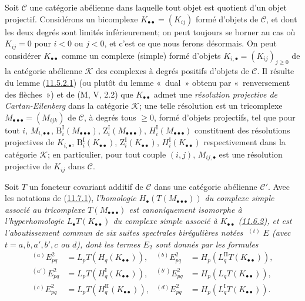 \begin{env}[11.7.1]
\label{0.11.7.1-fr}
Soit $\mathcal C$ une catégorie abélienne dans laquelle tout objet est
quotient d'un objet projectif. Considérons un bicomplexe
$K_{\bullet\bullet}=(K_{ij})$ formé d'objets de $\mathcal C$, et dont les deux
degrés sont limités inférieurement; on peut toujours se borner au cas où
$K_{ij}=0$ pour $i<0$ ou $j<0$, et c'est ce que nous ferons désormais. On
peut considérer $K_{\bullet\bullet}$ comme un complexe (simple) formé
d'objets $K_{i,\bullet}=(K_{ij})_{j\geq 0}$ de la catégorie abélienne
$\mathcal K$ des complexes à degrés positifs d'objets de $\mathcal C$. Il
résulte du lemme (\hyperref[0.11.5.2.1-fr]{11.5.2.1}) (ou plutôt du lemme
«~dual~» obtenu par «~renversement des flèches~») et de (M, V, 2.2) que
$K_{\bullet\bullet}$ admet une \emph{résolution projective de
Cartan-Eilenberg} dans la catégorie $\mathcal K$; une telle résolution est un
tricomplexe $M_{\bullet\bullet\bullet}=(M_{ijk})$ de $\mathcal C$, à degrés
tous $\geq 0$, formé d'objets projectifs, tel que pour tout $i$,
$M_{i,\bullet\bullet}$, $\mathrm B_i^{\mathrm I}(M_{\bullet\bullet\bullet})$,
$\mathrm Z_i^{\mathrm I}(M_{\bullet\bullet\bullet})$,
$H_i^{\mathrm I}(M_{\bullet\bullet\bullet})$ constituent des résolutions
projectives de $K_{i,\bullet}$,
$\mathrm B_i^{\mathrm I}(K_{\bullet\bullet})$,
$\mathrm Z_i^{\mathrm I}(K_{\bullet\bullet})$,
$H_i^{\mathrm I}(K_{\bullet\bullet})$ respectivement dans la catégorie
$\mathcal K$; en particulier, pour tout couple $(i,j)$,
$M_{ij,\bullet}$ est une résolution projective de $K_{ij}$ dans
$\mathcal C$.
\end{env}

\begin{proposition}[11.7.2]
\label{0.11.7.2-fr}
Soit $T$ un foncteur covariant additif de $\mathcal C$ dans une catégorie
abélienne $\mathcal C'$. Avec les notations de
(\hyperref[0.11.7.1-fr]{11.7.1}), \emph{l'homologie
$H_\bullet(T(M_{\bullet\bullet\bullet}))$ du complexe simple associé au
tricomplexe $T(M_{\bullet\bullet\bullet})$ est canoniquement isomorphe à
l'hyperhomologie $L_\bullet T(K_{\bullet\bullet})$ du complexe
simple associé à $K_{\bullet\bullet}$
(\hyperref[0.11.6.2-fr]{11.6.2}), et est
l'aboutissement commun de six suites spectrales birégulières notées
$\mathop{}^{(t)}E$ (avec $t=a,b,a',b',c$ ou $d$), dont les termes $E_2$ sont
donnés par les formules}
\[
\begin{aligned}
{}^{(a)}E^2_{pq}&=L_pT(H_q(K_{\bullet\bullet})),&
{}^{(b)}E^2_{pq}&=H_p(L_q^{\mathrm{II}}T(K_{\bullet\bullet})),\\
{}^{(a')}E^2_{pq}&=L_pT(H_q^{\mathrm I}(K_{\bullet\bullet})),&
{}^{(b')}E^2_{pq}&=H_p(L_qT(K_{\bullet\bullet})),\\
{}^{(c)}E^2_{pq}&=L_pT(H_q^{\mathrm{II}}(K_{\bullet\bullet})),&
{}^{(d)}E^2_{pq}&=H_p(L_q^{\mathrm I}T(K_{\bullet\bullet})).
\end{aligned}
\]
\end{proposition}

